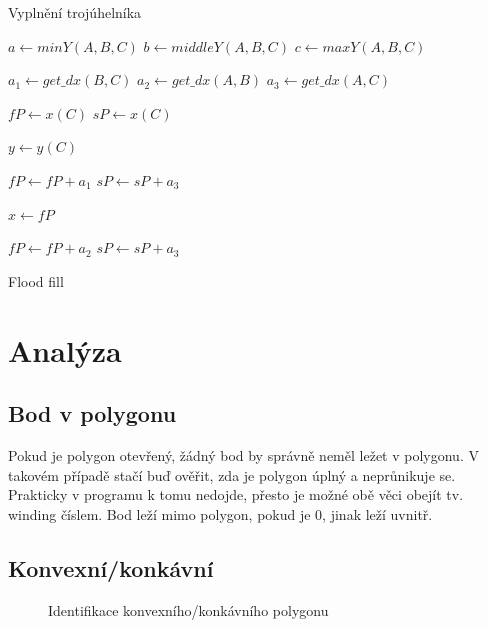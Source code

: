 \documentclass[a4paper,12pt]{book}
\begin{document}
\begin{algorithm}
\begin{algorithmic}
\ContinuedFloat
\caption{Vyplnění trojúhelníka}

\State $a \gets minY(A,B,C)$
\State $b \gets middleY(A,B,C)$
\State $c \gets maxY(A,B,C)$

\State $a_1 \gets get\_dx(B,C)$ %
\State $a_2 \gets get\_dx(A,B)$ %
\State $a_3 \gets get\_dx(A,C)$ %

\State $fP \gets x(C)$
\State $sP \gets x(C)$

\State $y \gets y(C)$

	\State $fP \gets fP+a_1$
	\State $sP \gets sP+a_3$
	
	\State $x \gets fP$
	\\
	\EndWhile	
\EndFor



	\State $fP \gets fP+a_2$
	\State $sP \gets sP+a_3$

	
\EndFor



\EndFunction





\end{algorithmic}
\end{algorithm}





Flood fill




\chapter{Analýza}
\section{Bod v polygonu}
Pokud je polygon otevřený, žádný bod by správně neměl ležet v polygonu. V takovém případě stačí buď ověřit, zda je polygon úplný a neprůnikuje se. Prakticky v programu k tomu nedojde, přesto je možné obě věci obejít tv. winding číslem. Bod leží mimo polygon, pokud je 0, jinak leží uvnitř.


\section{Konvexní/konkávní}
 \begin{figure}[H]
  \centering
  
  \caption{Identifikace konvexního/konkávního polygonu}
\end{figure}
\end{document}
